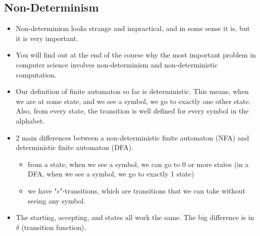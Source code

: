 \documentclass[11pt,a4paper]{article}
\begin{document}
\subsection{Non-Determinism}
\begin{itemize}
    \item Non-determinism looks strange and impractical, and in some sense it is, but it is very important.
    \item You will find out at the end of the course why the most important problem in computer science involves non-determinism and non-deterministic computation.
    \item Our definition of finite automaton so far is deterministic. This means, when we are at some state, and we see a symbol, we go to exactly one other state. Also, from every state, the transition is well defined for every symbol in the alphabet.
    \item 2 main differences between a non-deterministic finite automaton (NFA) and deterministic finite automaton (DFA).
    \begin{itemize}
        \item from a state, when we see a symbol, we can go to 0 or more states (in a DFA, when we see a symbol, we go to exactly 1 state)
        \item we have "$\epsilon$"-transitions, which are transitions that we can take without seeing any symbol.
    \end{itemize}
    \item The starting, accepting, and states all work the same. The big difference is in $\delta$ (transition function).
\end{itemize}
\end{document}
